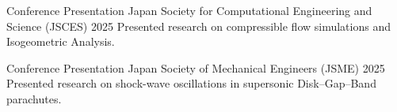 
\publication
{Conference Presentation}
{Japan Society for Computational Engineering and Science (JSCES)}
{2025}
{Presented research on compressible flow simulations and
Isogeometric Analysis.}

\vspace{0.010cm}

\publication
{Conference Presentation}
{Japan Society of Mechanical Engineers (JSME)}
{2025}
{Presented research on shock-wave oscillations in
supersonic Disk--Gap--Band parachutes.}

\vspace{0.010cm}

\printbibliography[heading=none]
